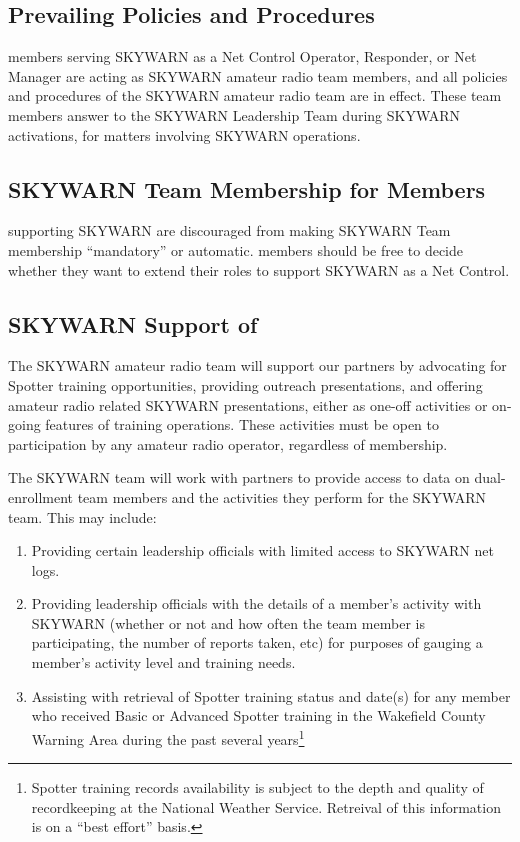 \documentclass[pdflatex,letterpaper,twoside,12pt]{book}
\begin{document}
\subsection{Prevailing Policies and Procedures}

\tpteam members serving SKYWARN as a Net Control Operator, Responder, or Net Manager are acting as SKYWARN amateur radio team members, and all policies and procedures of the SKYWARN amateur radio team are in effect.  These team members answer to the SKYWARN Leadership Team during SKYWARN activations, for matters involving SKYWARN operations.


\subsection{SKYWARN Team Membership for \tpteam Members}

\tpteams supporting SKYWARN are discouraged from making SKYWARN Team membership ``mandatory'' or automatic.  \tpteam members should be free to decide whether they want to extend their roles to support SKYWARN as a Net Control.


\subsection{SKYWARN Support of \tpteams}

The SKYWARN amateur radio team will support our \tpteam partners by advocating for Spotter training opportunities, providing outreach presentations, and offering amateur radio related SKYWARN presentations, either as one-off activities or on-going features of \tpteam training operations.  These activities must be open to participation by any amateur radio operator, regardless of \tpteam membership.

The SKYWARN team will work with \tpteam partners to provide access to data on dual-enrollment team members and the activities they perform for the SKYWARN team.  This may include:

\begin{enumerate}
\item Providing certain \tpteam leadership officials with limited access to SKYWARN net logs.
\item Providing \tpteam leadership officials with the details of a member's activity with SKYWARN (whether or not and how often the team member is participating, the number of reports taken, etc) for purposes of gauging a member's activity level and training needs.
\item Assisting with retrieval of Spotter training status and date(s) for any \tpteam member who received Basic or Advanced Spotter training in the Wakefield County Warning Area during the past several years\footnote{Spotter training records availability is subject to the depth and quality of recordkeeping at the National Weather Service. Retreival of this information is on a ``best effort'' basis.}
\end{enumerate}
\end{document}
